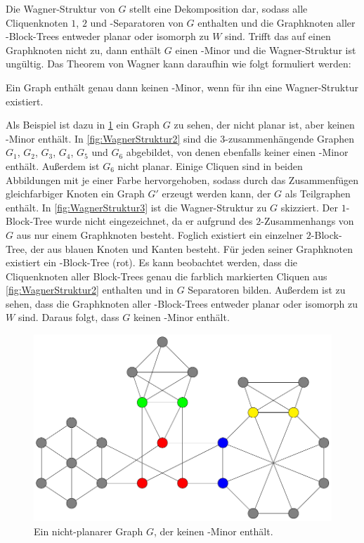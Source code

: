Die Wagner-Struktur von $G$ stellt eine Dekomposition dar, sodass alle Cliquenknoten $1$, $2$ und \dd-Separatoren von $G$ enthalten und die Graphknoten aller \dd-Block-Trees entweder planar oder isomorph zu $W$ sind.
Trifft das auf einen Graphknoten nicht zu, dann enthält $G$ einen \kf-Minor und die Wagner-Struktur ist ungültig.
Das Theorem von Wagner kann daraufhin wie folgt formuliert werden:

\begin{theorem}\label{eq:TheoremWagner}
  Ein Graph enthält genau dann keinen \kf-Minor, wenn für ihn eine Wagner-Struktur existiert\cite{Wag37}.
\end{theorem}

Als Beispiel ist dazu in \Abb \ref{fig:WagnerStruktur1} ein Graph $G$ zu sehen, der nicht planar ist, aber keinen \kf-Minor enthält.
In \Abb \ref{fig:WagnerStruktur2} sind die $3$-zusammenhängende Graphen $G_1$, $G_2$, $G_3$, $G_4$, $G_5$ und $G_6$ abgebildet, von denen ebenfalls keiner einen \kf-Minor enthält.
Außerdem ist $G_6$ nicht planar.
Einige Cliquen sind in beiden Abbildungen mit je einer Farbe hervorgehoben, sodass durch das Zusammenfügen gleichfarbiger Knoten ein Graph $G'$ erzeugt werden kann, der $G$ als Teilgraphen enthält.
In \Abb \ref{fig:WagnerStruktur3} ist die Wagner-Struktur zu $G$ skizziert.
Der $1$-Block-Tree wurde nicht eingezeichnet, da er aufgrund des $2$-Zusammenhangs von $G$ aus nur einem Graphknoten besteht.
Foglich existiert ein einzelner $2$-Block-Tree, der aus blauen Knoten und Kanten besteht.
Für jeden seiner Graphknoten existiert ein \dd-Block-Tree (rot).
Es kann beobachtet werden, dass die Cliquenknoten aller Block-Trees genau die farblich markierten Cliquen aus \Abb \ref{fig:WagnerStruktur2} enthalten und in $G$ Separatoren bilden.
Außerdem ist zu sehen, dass die Graphknoten aller \dd-Block-Trees entweder planar oder isomorph zu $W$ sind.
Daraus folgt, dass $G$ keinen \kf-Minor enthält.

\begin{figure}[H]
  \centering
  \includegraphics[width=\textwidth,height=\textheight,keepaspectratio]{bilder/WagnerTheorem1.pdf}
  \caption{Ein nicht-planarer Graph $G$, der keinen \kf-Minor enthält.}
  \label{fig:WagnerStruktur1}
\end{figure}

